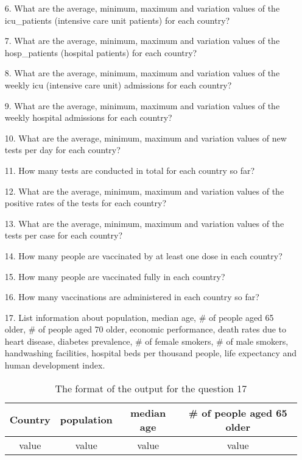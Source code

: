 \documentclass[a4 paper]{article}
\newcommand{\0}{\mathbf{0}}
\begin{document}
\begin{itemize}
\begin{table}[ht]
\begin{tabular}{c c c c c}
			\hline %
		\end{tabular}\label{table:nonlin}%
	\end{table}
	\item[6. ] What are the average, minimum, maximum and variation values of the icu\_patients (intensive care unit patients) for each country?
	\item[7. ] What are the average, minimum, maximum and variation values of the hosp\_patients (hospital patients) for each country?
	\item[8. ] What are the average, minimum, maximum and variation values of the weekly icu (intensive care unit) admissions for each country?
	\item[9. ] What are the average, minimum, maximum and variation values of the weekly hospital admissions for each country?
	\item[10. ] What are the average, minimum, maximum and variation values of new tests per day for each country?
	\item[11. ] How many tests are conducted in total for each country so far?
	\item[12. ] What are the average, minimum, maximum and variation values of the positive rates of the tests for each country?
	\item[13. ] What are the average, minimum, maximum and variation values of the tests per case for each country?
	\item[14. ] How many people are vaccinated by at least one dose in each country?
	\item[15. ] How many people are vaccinated fully in each country?
	\item[16. ] How many vaccinations are administered in each country so far?
	\item[17. ] List information about population, median age, \# of people aged 65 older, \# of people aged 70 older, economic performance, death rates due to heart disease, diabetes prevalence, \# of female smokers, \# of	male smokers, 	handwashing facilities,	hospital beds per thousand people,	life expectancy and	human development index.
		\begin{table}[ht]
		\caption{The format of the output for the question 17} %
		\centering  %
		\begin{tabular}{c c c c}%
			\hline\hline       %
			Country & population & median age & \# of people aged 65 older \\ 
			[0.5ex]%
			\hline      %
			value & value & value & value \\%
			

\end{tabular}
\end{table}
\end{itemize}
\end{document}
